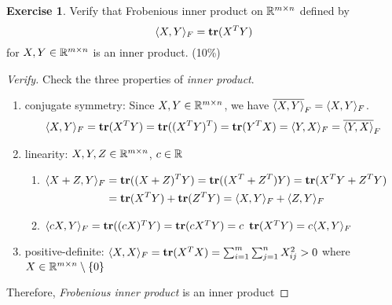 \documentclass[12pt]{extarticle}
\theoremstyle{definition}
\newtheorem{exercise}{Exercise}
\begin{document}
\begin{exercise}
  Verify that Frobenious inner product on $\mathbb{R}^{m\times n}$ defined by
  $$\langle X,Y\rangle_F=\mathop{\bf tr}(X^TY)$$
  for $X, Y\in\mathbb{R}^{m\times n}$ is an inner product. (10\%)
\end{exercise}
\begin{proof}[Verify]
  Check the three properties of \textit{inner product}.
  \begin{enumerate}[label=(\arabic*)]
    \item conjugate symmetry: Since $X, Y\in \mathbb{R}^{m\times n}$, we have $\overline{\langle X,Y\rangle}_F=\langle X,Y\rangle_F$.
      \begin{align*}
        \langle X,Y\rangle_F=\mathop{\bf tr}(X^TY)=\mathop{\bf tr}((X^TY)^T)=\mathop{\bf tr}(Y^TX)=\langle Y,X\rangle_F=\overline{\langle Y,X\rangle}_F
      \end{align*}
    \item linearity: $X, Y, Z\in\mathbb{R}^{m\times n}$, $c\in\mathbb{R}$
      \begin{enumerate}[label=(\roman*)]
        \item $\begin{aligned}[t]\langle X+Z,Y\rangle_F &= \mathop{\bf tr}((X+Z)^TY)=\mathop{\bf tr}((X^T+Z^T)Y)=\mathop{\bf tr}(X^TY+Z^TY)\\
                                             &= \mathop{\bf tr}(X^TY)+\mathop{\bf tr}(Z^TY)=\langle X,Y\rangle_F+\langle Z,Y\rangle_F\end{aligned}$
        \item $\<cX,Y\>_F=\tr((cX)^TY)=\tr(cX^TY)=c\ \tr(X^TY)=c\<X,Y\>_F$
      \end{enumerate}
    \item positive-definite: $\langle X,X\rangle_F=\mathop{\bf tr}(X^TX)=\sum_{i=1}^m\sum_{j=1}^nX_{ij}^2>0$ where $X\in\mathbb{R}^{m\times n}\setminus\{0\}$
  \end{enumerate}
  Therefore, \textit{Frobenious inner product} is an inner product
\end{proof}
\end{document}
